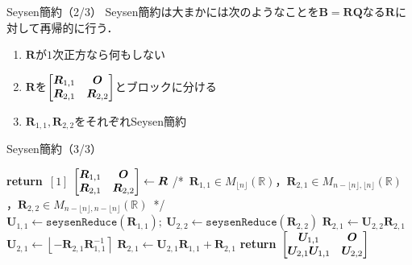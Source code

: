 \documentclass[12pt,aspectratio=169,table,dvipdfmx, leqno]{beamer}
\renewcommand{\Comment}[1]{\quad/*~#1~*/}
\newcommand{\round}[1]{\left\lfloor #1 \right\rceil}
\begin{document}
\begin{frame}{Seysen簡約（2/3）}
    Seysen簡約は大まかには次のようなことを$\bm{B}=\bm{RQ}$なる$\bm{R}$に対して再帰的に行う．
    \begin{enumerate}
        \item $\bm{R}$が$1$次正方なら何もしない
        \item $\bm{R}$を$\mqty[\bm{R}_{1, 1} & \bm{O}\\ \bm{R}_{2, 1} & \bm{R}_{2, 2}]$とブロックに分ける
        \item $\bm{R}_{1, 1}, \bm{R}_{2, 2}$をそれぞれSeysen簡約
    \end{enumerate}
\end{frame}

\begin{frame}{Seysen簡約（3/3）}
\begin{algorithm}[H]
    \footnotesize
    \begin{algorithmic}[1]
        \caption{\footnotesize Seysen簡約\cite{DPS25}}
        \label{alg_seysen}
            \State \textbf{return}~$[1]$
        \EndIf
        \State $\mqty[\bm{R}_{1, 1} & \bm{O}\\ \bm{R}_{2, 1} & \bm{R}_{2, 2}]\gets \bm{R}$ \Comment{$\bm{R}_{1, 1}\in M_{\lfloor n\rfloor}(\mathbb{R})$，$\bm{R}_{2, 1}\in M_{n-\lfloor n\rfloor, \lfloor n\rfloor}(\mathbb{R})$，$\bm{R}_{2, 2}\in M_{n-\lfloor n\rfloor, n-\lfloor n\rfloor}(\mathbb{R})$}
        \State $\bm{U}_{1, 1}\gets \texttt{seysenReduce}(\bm{R}_{1, 1});~\bm{U}_{2, 2}\gets \texttt{seysenReduce}(\bm{R}_{2, 2})$
        \State $\bm{R}_{2, 1}\gets \bm{U}_{2, 2}\bm{R}_{2, 1}$
        \State $\bm{U}_{2, 1}\gets \round{-\bm{R}_{2, 1}\bm{R}_{1, 1}^{-1}}$
        \State $\bm{R}_{2, 1}\gets \bm{U}_{2, 1}\bm{R}_{1, 1}+\bm{R}_{2, 1}$
        \State \textbf{return}~$\mqty[\bm{U}_{1, 1} & \bm{O}\\ \bm{U}_{2, 1}\bm{U}_{1, 1} & \bm{U}_{2, 2}]$
    \end{algorithmic}
\end{algorithm}
\end{frame}
\end{document}
